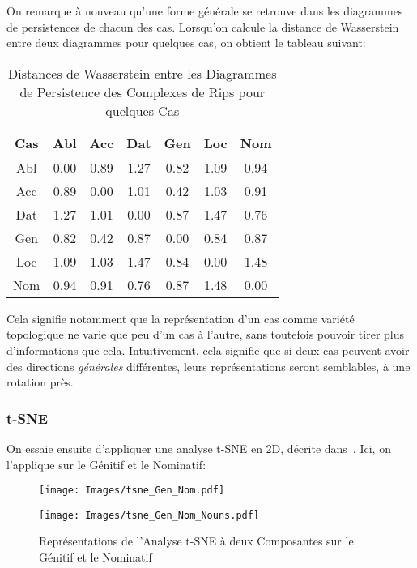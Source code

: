 \documentclass{article}
\begin{document}
On remarque à nouveau qu'une forme générale se retrouve dans les diagrammes de persistences de chacun des cas.
Lorsqu'on calcule la distance de Wasserstein entre deux diagrammes pour quelques cas, on obtient le tableau suivant:

\begin{table}[h]
\centering
\begin{tabular}{c|cccccc}
        \toprule
        Cas & Abl & Acc & Dat & Gen & Loc & Nom\\
        \midrule
        Abl & 0.00 & 0.89 & 1.27 & 0.82 & 1.09 & 0.94\\
        Acc & 0.89 & 0.00 & 1.01 & 0.42 & 1.03 & 0.91\\
        Dat & 1.27 & 1.01 & 0.00 & 0.87 & 1.47 & 0.76\\
        Gen & 0.82 & 0.42 & 0.87 & 0.00 & 0.84 & 0.87\\
        Loc & 1.09 & 1.03 & 1.47 & 0.84 & 0.00 & 1.48\\
        Nom & 0.94 & 0.91 & 0.76 & 0.87 & 1.48 & 0.00\\
        \bottomrule
\end{tabular}
\caption{Distances de Wasserstein entre les Diagrammes de Persistence des Complexes de Rips pour quelques Cas}
\end{table}

Cela signifie notamment que la représentation d'un cas comme variété topologique ne varie que peu d'un cas à l'autre, sans toutefois pouvoir tirer plus d'informations que cela.
Intuitivement, cela signifie que si deux cas peuvent avoir des directions \textit{générales} différentes, leurs représentations seront semblables, à une rotation près.

\subsubsection{t-SNE}\label{subsub:tsne}
On essaie ensuite d'appliquer une analyse t-SNE en 2D, décrite dans~\cite{tSNE}.
Ici, on l'applique sur le Génitif et le Nominatif:
\begin{figure}[h]
\begin{minipage}{.5\textwidth}
        \begin{center}
        \texttt{[image: Images/tsne\_Gen\_Nom.pdf]}
        \end{center}
\end{minipage}
\begin{minipage}{.5\textwidth}
        \begin{center}
        \texttt{[image: Images/tsne\_Gen\_Nom\_Nouns.pdf]}
        \end{center}
\end{minipage}
\caption{Représentations de l'Analyse t-SNE à deux Composantes sur le Génitif et le Nominatif}
\end{figure}
\end{document}
